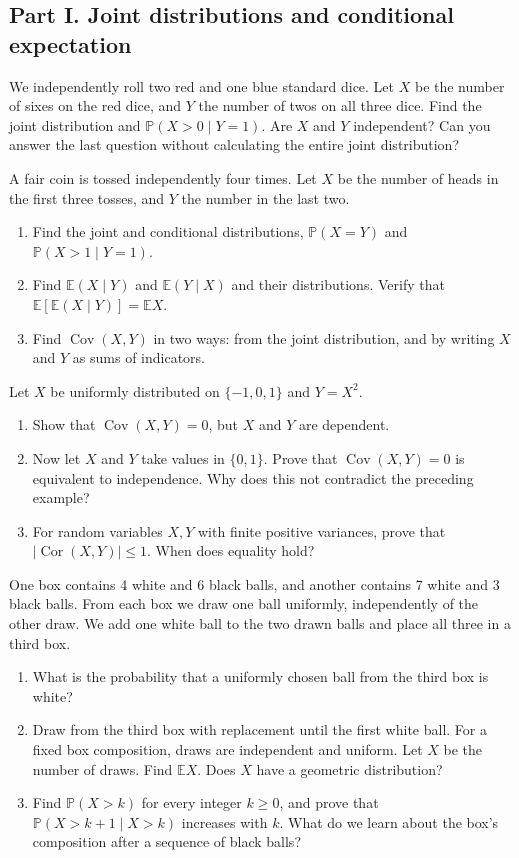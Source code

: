 \documentclass[11pt,a4paper]{article}
\newenvironment{enumeratea}{\begin{enumerate}[label=(\alph*),itemsep=0.28em,topsep=0.25em]}{\end{enumerate}}
\newcommand{\Pbb}{\mathbb P}
\newcommand{\Ebb}{\mathbb E}
\newcommand{\Cov}{\operatorname{Cov}}
\newcommand{\Cor}{\operatorname{Cor}}
\newcounter{problem}[section]
\begin{document}
\subsection*{Part I. Joint distributions and conditional expectation}
\begin{problembook}
We independently roll two red and one blue standard dice. Let $X$ be the number
of sixes on the red dice, and $Y$ the number of twos on all three dice. Find the
joint distribution and $\Pbb(X>0\mid Y=1)$. Are $X$ and $Y$ independent?
Can you answer the last question without calculating the entire joint distribution?
\end{problembook}
\begin{problembook}
A fair coin is tossed independently four times. Let $X$ be the number of heads
in the first three tosses, and $Y$ the number in the last two.
\begin{enumeratea}
  \item Find the joint and conditional distributions, $\Pbb(X=Y)$ and $\Pbb(X>1\mid Y=1)$.
  \item Find $\Ebb(X\mid Y)$ and $\Ebb(Y\mid X)$ and their distributions.
  Verify that $\Ebb[\Ebb(X\mid Y)]=\Ebb X$.
  \item Find $\Cov(X,Y)$ in two ways: from the joint distribution, and by writing
  $X$ and $Y$ as sums of indicators.
\end{enumeratea}
\end{problembook}
\begin{problembook}
Let $X$ be uniformly distributed on $\{-1,0,1\}$ and $Y=X^2$.
\begin{enumeratea}
  \item Show that $\Cov(X,Y)=0$, but $X$ and $Y$ are dependent.
  \item Now let $X$ and $Y$ take values in $\{0,1\}$. Prove that $\Cov(X,Y)=0$
  is equivalent to independence. Why does this not contradict the preceding example?
  \item For random variables $X,Y$ with finite positive variances, prove that
  $|\Cor(X,Y)|\le1$. When does equality hold?
\end{enumeratea}
\end{problembook}
\begin{problempencil}
One box contains 4 white and 6 black balls, and another contains 7 white and
3 black balls. From each box we draw one ball uniformly, independently of the
other draw. We add one white ball to the two drawn balls and place all three in a third box.
\begin{enumeratea}
  \item What is the probability that a uniformly chosen ball from the third box is white?
  \item Draw from the third box with replacement until the first white ball.
  For a fixed box composition, draws are independent and uniform. Let $X$ be the
  number of draws. Find $\Ebb X$. Does $X$ have a geometric distribution?
  \item Find $\Pbb(X>k)$ for every integer $k\ge0$, and prove that
  $\Pbb(X>k+1\mid X>k)$ increases with $k$. What do we learn about the box's
  composition after a sequence of black balls?
\end{enumeratea}
\end{problempencil}
\end{document}
